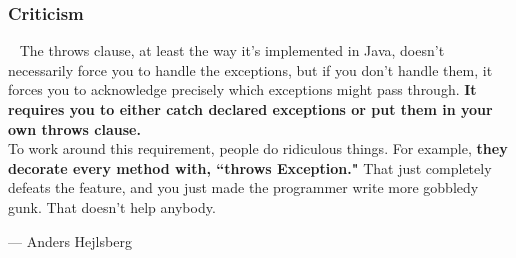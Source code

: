 \documentclass[UTF8,lualatex]{ctexbeamer}
\renewcommand{\emph}[1]{\textbf{#1}}
\begin{document}

\begin{frame}
    \frametitle{Criticism}
    \begin{block}{~}
        The throws clause, at least the way it's implemented in Java,
        doesn't necessarily force you to handle the exceptions,
        but if you don't handle them,
        it forces you to acknowledge precisely which exceptions might pass through.
        \emph{It requires you to either catch declared exceptions or put them in your own throws clause.}
        \\[1ex]
        To work around this requirement, people do ridiculous things.
        For example, \emph{they decorate every method with, ``throws Exception."}
        That just completely defeats the feature, and you just made the programmer write more gobbledy gunk.
        That doesn't help anybody.

        \flushright --- Anders Hejlsberg
    \end{block}
\end{frame}

\end{document}
